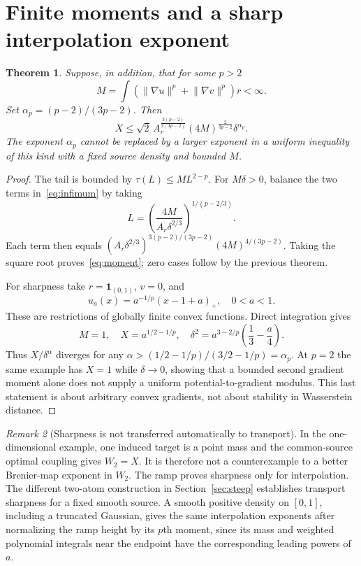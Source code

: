 \documentclass[11pt]{article}
\newtheorem{theorem}{Theorem}[section]
\theoremstyle{remark}\newtheorem{remark}[theorem]{Remark}
\newcommand{\norm}[1]{\lVert#1\rVert}\newcommand{\ind}{\mathbf 1}
\begin{document}
\section{Finite moments and a sharp interpolation exponent}
\begin{theorem}\label{thm:moment}
Suppose, in addition, that for some $p>2$
\[
 M=\int(\norm{\nabla u}^p+\norm{\nabla v}^p)r<\infty.
\]
Set $\alpha_p=(p-2)/(3p-2)$. Then
\begin{equation}\label{eq:moment}
 X\le\sqrt2\,A_r^{\frac{3(p-2)}{2(3p-2)}}
                 (4M)^{\frac2{3p-2}}\delta^{\alpha_p}.
\end{equation}
The exponent $\alpha_p$ cannot be replaced by a larger exponent in a uniform inequality of this kind with a fixed source density and bounded $M$.
\end{theorem}
\begin{proof}
The tail is bounded by $\tau(L)\le ML^{2-p}$. For $M\delta>0$, balance the two terms in~\eqref{eq:infimum} by taking
\[
 L=\left(\frac{4M}{A_r\delta^{2/3}}\right)^{1/(p-2/3)}.
\]
Each term then equals
$(A_r\delta^{2/3})^{3(p-2)/(3p-2)}(4M)^{4/(3p-2)}$.
Taking the square root proves~\eqref{eq:moment}; zero cases follow by the previous theorem.

For sharpness take $r=\ind_{(0,1)}$, $v=0$, and
\[
 u_a(x)=a^{-1/p}(x-1+a)_+,\quad0<a<1.
\]
These are restrictions of globally finite convex functions. Direct integration gives
\[
 M=1,\quad X=a^{1/2-1/p},\quad
 \delta^2=a^{3-2/p}\left(\frac13-\frac a4\right).
\]
Thus $X/\delta^\alpha$ diverges for any
$\alpha>(1/2-1/p)/(3/2-1/p)=\alpha_p$. At $p=2$ the same example has $X=1$ while $\delta\to0$, showing that a bounded second gradient moment alone does not supply a uniform potential-to-gradient modulus. This last statement is about arbitrary convex gradients, not about stability in Wasserstein distance.
\end{proof}

\begin{remark}[Sharpness is not transferred automatically to transport]
In the one-dimensional example, one induced target is a point mass and the common-source optimal coupling gives $W_2=X$. It is therefore not a counterexample to a better Brenier-map exponent in $W_2$. The ramp proves sharpness only for interpolation. The different two-atom construction in Section~\ref{sec:steep} establishes transport sharpness for a fixed smooth source. A smooth positive density on $[0,1]$, including a truncated Gaussian, gives the same interpolation exponents after normalizing the ramp height by its $p$th moment, since its mass and weighted polynomial integrals near the endpoint have the corresponding leading powers of $a$.
\end{remark}
\end{document}
